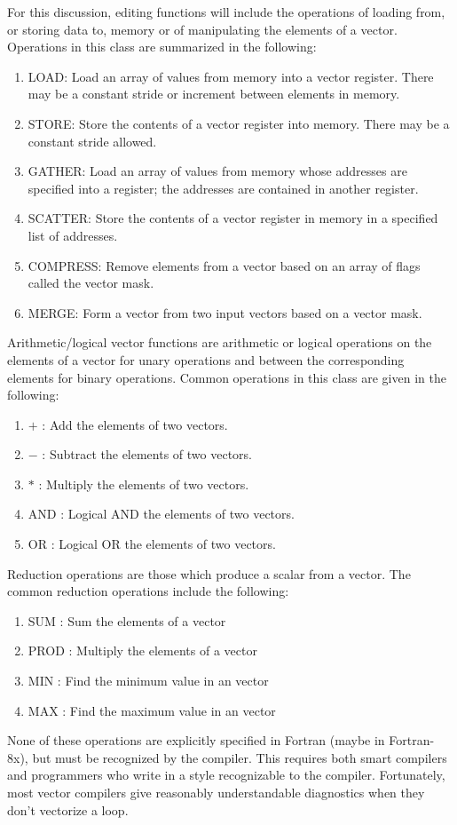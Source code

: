 For this discussion, editing functions will include the operations of
loading from, or storing data to, memory or of manipulating the
elements of a vector.  Operations in this class are summarized in the
following:
\begin{enumerate} %
\item LOAD: Load an array of values from memory into a vector register.
There may be a constant stride or increment between elements in
memory.
\item STORE: Store the contents of a vector register into memory.  There may
be a constant stride allowed.
\item GATHER: Load an array of values from memory whose addresses are
specified into a register; the addresses are contained in another
register.
\item SCATTER: Store the contents of a vector register in memory in a
specified list of addresses.
\item COMPRESS: Remove elements from a vector based on an array of flags
called the vector mask.
\item MERGE: Form a vector from two input vectors based on a vector mask.

\end{enumerate} %
Arithmetic/logical vector functions are arithmetic or logical
operations on the elements of a vector for unary operations and
between the corresponding elements for binary operations.  Common
operations in this class are given in the following:
\begin{enumerate} %
\item $+$ : Add the elements of two vectors.

\item $-$ : Subtract the elements of two vectors.

\item $\ast$ : Multiply the elements of two vectors.

\item AND : Logical AND the elements of two vectors.

\item OR : Logical OR the elements of two vectors.

\end{enumerate} %
Reduction operations are those which produce a scalar from a vector.
The common reduction operations include the following:
\begin{enumerate} %
\item SUM : Sum the elements of a vector
\item PROD : Multiply the elements of a vector
\item MIN : Find the minimum value in an vector
\item MAX : Find the maximum value in an vector

\end{enumerate} %
None of these operations are explicitly specified in Fortran (maybe in
Fortran-8x), but must be recognized by the compiler.  This requires
both smart compilers and programmers who write in a style recognizable
to the compiler.  Fortunately, most vector compilers give reasonably
understandable diagnostics when they don't vectorize a loop.

